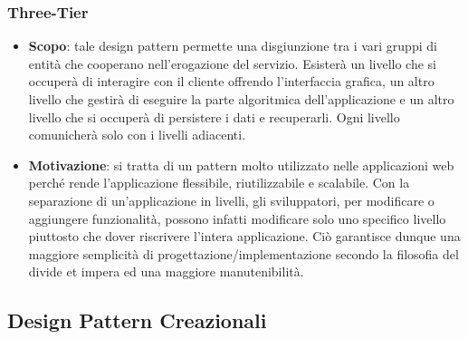 		\subsubsection{Three-Tier}
		\begin{itemize}
		\item \textbf{Scopo}: tale design pattern permette una disgiunzione tra i vari gruppi di
entità che cooperano nell’erogazione del servizio. Esisterà un livello che si occuperà
di interagire con il cliente offrendo l’interfaccia grafica, un altro livello che gestirà
di eseguire la parte algoritmica dell’applicazione e un altro livello che si occuperà di
persistere i dati e recuperarli. Ogni livello comunicherà solo con i livelli adiacenti.

	\item \textbf{Motivazione}: si tratta di un pattern molto utilizzato nelle applicazioni web perché rende l’applicazione flessibile, riutilizzabile e scalabile. Con la separazione di un’applicazione in livelli, gli sviluppatori, per modificare o aggiungere funzionalità, possono infatti modificare solo uno specifico livello piuttosto che dover riscrivere l’intera applicazione. Ciò garantisce dunque una maggiore semplicità di progettazione/implementazione secondo la filosofia del divide et impera ed una maggiore manutenibilità.
		\end{itemize}
	\subsection{Design Pattern Creazionali}
	
